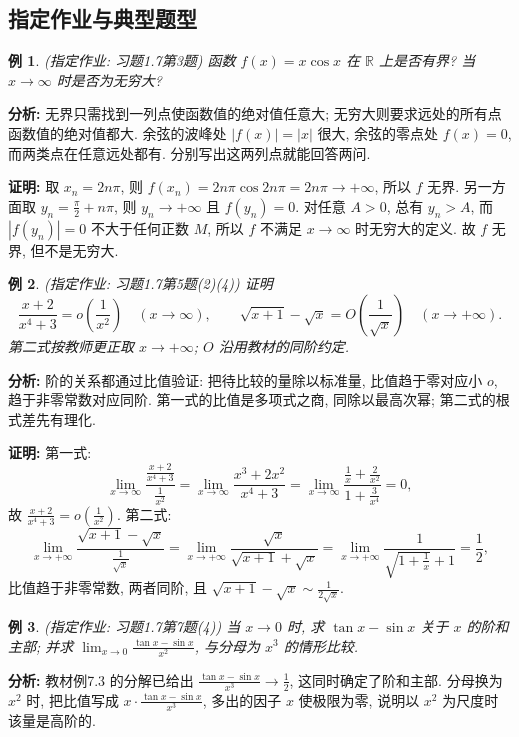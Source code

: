 \documentclass[UTF8,openany]{ctexbook}
\theoremstyle{chinesetextbook}
\newtheorem{example}{例}[section]
\newenvironment{cnproof}{\par\indent\textbf{证明:} \ignorespaces}{\par}
\begin{document}
\subsection{指定作业与典型题型}
\begin{example}
\textnormal{(指定作业: 习题1.7第3题)} 函数 $f(x)=x\cos x$ 在 $\mathbb R$ 上是否有界? 当 $x\to\infty$ 时是否为无穷大?
\end{example}
\par\indent\textbf{分析:} 无界只需找到一列点使函数值的绝对值任意大; 无穷大则要求远处的所有点函数值的绝对值都大. 余弦的波峰处 $|f(x)|=|x|$ 很大, 余弦的零点处 $f(x)=0$, 而两类点在任意远处都有. 分别写出这两列点就能回答两问.
\begin{cnproof}
取 $x_n=2n\pi$, 则 $f(x_n)=2n\pi\cos2n\pi=2n\pi\to+\infty$, 所以 $f$ 无界. 另一方面取 $\displaystyle y_n=\frac\pi2+n\pi$, 则 $y_n\to+\infty$ 且 $f(y_n)=0$. 对任意 $A>0$, 总有 $y_n>A$, 而 $|f(y_n)|=0$ 不大于任何正数 $M$, 所以 $f$ 不满足 $x\to\infty$ 时无穷大的定义. 故 $f$ 无界, 但不是无穷大.
\end{cnproof}
\begin{example}
\textnormal{(指定作业: 习题1.7第5题(2)(4))} 证明
\[
\frac{x+2}{x^4+3}=o\!\left(\frac1{x^2}\right)\quad(x\to\infty),
\qquad
\sqrt{x+1}-\sqrt x=O\!\left(\frac1{\sqrt x}\right)\quad(x\to+\infty).
\]
第二式按教师更正取 $x\to+\infty$; $O$ 沿用教材的同阶约定.
\end{example}
\par\indent\textbf{分析:} 阶的关系都通过比值验证: 把待比较的量除以标准量, 比值趋于零对应小 $o$, 趋于非零常数对应同阶. 第一式的比值是多项式之商, 同除以最高次幂; 第二式的根式差先有理化.
\begin{cnproof}
第一式:
\[
\lim_{x\to\infty}\frac{\frac{x+2}{x^4+3}}{\frac1{x^2}}
=\lim_{x\to\infty}\frac{x^3+2x^2}{x^4+3}
=\lim_{x\to\infty}\frac{\frac1x+\frac2{x^2}}{1+\frac3{x^4}}=0,
\]
故 $\displaystyle\frac{x+2}{x^4+3}=o\!\left(\frac1{x^2}\right)$. 第二式:
\[
\lim_{x\to+\infty}\frac{\sqrt{x+1}-\sqrt x}{\frac1{\sqrt x}}
=\lim_{x\to+\infty}\frac{\sqrt x}{\sqrt{x+1}+\sqrt x}
=\lim_{x\to+\infty}\frac1{\sqrt{1+\frac1x}+1}=\frac12,
\]
比值趋于非零常数, 两者同阶, 且 $\displaystyle\sqrt{x+1}-\sqrt x\sim\frac1{2\sqrt x}$.
\end{cnproof}
\begin{example}
\textnormal{(指定作业: 习题1.7第7题(4))} 当 $x\to0$ 时, 求 $\tan x-\sin x$ 关于 $x$ 的阶和主部; 并求 $\displaystyle\lim_{x\to0}\frac{\tan x-\sin x}{x^2}$, 与分母为 $x^3$ 的情形比较.
\end{example}
\par\indent\textbf{分析:} 教材例7.3 的分解已给出 $\displaystyle\frac{\tan x-\sin x}{x^3}\to\frac12$, 这同时确定了阶和主部. 分母换为 $x^2$ 时, 把比值写成 $\displaystyle x\cdot\frac{\tan x-\sin x}{x^3}$, 多出的因子 $x$ 使极限为零, 说明以 $x^2$ 为尺度时该量是高阶的.
\end{document}
